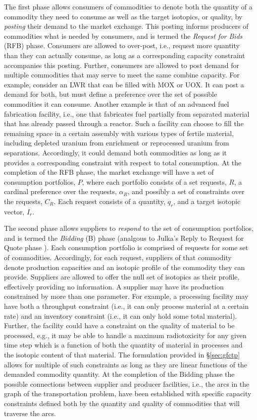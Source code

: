 The first phase allows consumers of commodities to denote both the quantity of a
commodity they need to consume as well as the target isotopics, or quality, by
\textit{posting} their demand to the market exchange. This posting informs
producers of commodities what is needed by consumers, and is termed the
\textit{Request for Bids} (RFB) phase. Consumers are allowed to over-post, i.e.,
request more quantity than they can actually consume, as long as a corresponding
capacity constraint accompanies this posting. Further, consumers are allowed to
post demand for multiple commodities that may serve to meet the same combine
capacity. For example, consider an LWR that can be filled with MOX or UOX. It
can post a demand for both, but must define a preference over the set of
possible commodities it can consume. Another example is that of an advanced fuel
fabrication facility, i.e., one that fabricates fuel partially from separated
material that has already passed through a reactor. Such a facility can choose
to fill the remaining space in a certain assembly with various types of fertile
material, including depleted uranium from enrichment or reprocessed uranium from
separations. Accordingly, it could demand both commodities as long as it
provides a corresponding constraint with respect to total consumption. At the
completion of the RFB phase, the market exchange will have a set of consumption
portfolios, $P$, where each portfolio consists of a set requests, $R$, a
cardinal preference over the requests, $\alpha_R$, and possibly a set of
constraints over the requests, $C_R$. Each request consists of a quantity,
$q_r$, and a target isotopic vector, $I_r$.

The second phase allows suppliers to \textit{respond} to the set of consumption
portfolios, and is termed the \textit{Bidding} (B) phase (analgous to Julka's
Reply to Request for Quote phase \cite{julka_agent-based_2002}). Each
consumption portfolio is comprised of requests for some set of
commodities. Accordingly, for each request, suppliers of that commodity denote
production capacities and an isotopic profile of the commodity they can
provide. Suppliers are allowed to offer the null set of isotopics as their
profile, effectively providing no information. A supplier may have its
production constrained by more than one parameter. For example, a processing
facility may have both a throughput constraint (i.e., it can only process
material at a certain rate) and an inventory constraint (i.e., it can only hold
some total material). Further, the facility could have a constraint on the
quality of material to be processed, e.g., it may be able to handle a maximum
radiotoxicity for any given time step which is a function of both the quantity
of material in processes and the isotopic content of that material. The
formulation provided in \S\ref{sec:gfctp} allows for multiple of such
constraints as long as they are linear functions of the demanded commodity
quantity. At the completion of the Bidding phase the possible connections
between supplier and producer facilities, i.e., the arcs in the graph of the
transportation problem, have been established with specific capacity constraints
defined both by the quantity and quality of commodities that will traverse the
arcs.

